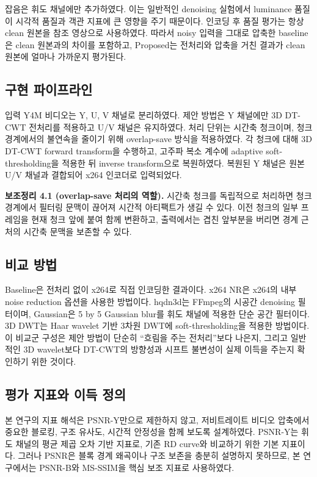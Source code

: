 \documentclass[10pt]{article}
\begin{document}
잡음은 휘도 채널에만 추가하였다. 이는 일반적인 denoising 실험에서 luminance 품질이 시각적 품질과 객관 지표에 큰 영향을 주기 때문이다. 인코딩 후 품질 평가는 항상 clean 원본을 참조 영상으로 사용하였다. 따라서 noisy 입력을 그대로 압축한 baseline은 clean 원본과의 차이를 포함하고, Proposed는 전처리와 압축을 거친 결과가 clean 원본에 얼마나 가까운지 평가된다.

\subsection{구현 파이프라인}
입력 Y4M 비디오는 Y, U, V 채널로 분리하였다. 제안 방법은 Y 채널에만 3D DT-CWT 전처리를 적용하고 U/V 채널은 유지하였다. 처리 단위는 시간축 청크이며, 청크 경계에서의 불연속을 줄이기 위해 overlap-save 방식을 적용하였다. 각 청크에 대해 3D DT-CWT forward transform을 수행하고, 고주파 복소 계수에 adaptive soft-thresholding을 적용한 뒤 inverse transform으로 복원하였다. 복원된 Y 채널은 원본 U/V 채널과 결합되어 x264 인코더로 입력되었다.

\noindent\textbf{보조정리 4.1 (overlap-save 처리의 역할).}
시간축 청크를 독립적으로 처리하면 청크 경계에서 필터링 문맥이 끊어져 시간적 아티팩트가 생길 수 있다. 이전 청크의 일부 프레임을 현재 청크 앞에 붙여 함께 변환하고, 출력에서는 겹친 앞부분을 버리면 경계 근처의 시간축 문맥을 보존할 수 있다.

\subsection{비교 방법}
Baseline은 전처리 없이 x264로 직접 인코딩한 결과이다. x264 NR은 x264의 내부 noise reduction 옵션을 사용한 방법이다. hqdn3d는 FFmpeg의 시공간 denoising 필터이며, Gaussian은 5 by 5 Gaussian blur를 휘도 채널에 적용한 단순 공간 필터이다. 3D DWT는 Haar wavelet 기반 3차원 DWT에 soft-thresholding을 적용한 방법이다. 이 비교군 구성은 제안 방법이 단순히 ``흐림을 주는 전처리''보다 나은지, 그리고 일반적인 3D wavelet보다 DT-CWT의 방향성과 시프트 불변성이 실제 이득을 주는지 확인하기 위한 것이다.

\subsection{평가 지표와 이득 정의}
본 연구의 지표 해석은 PSNR-Y만으로 제한하지 않고, 저비트레이트 비디오 압축에서 중요한 블로킹, 구조 유사도, 시간적 안정성을 함께 보도록 설계하였다. PSNR-Y는 휘도 채널의 평균 제곱 오차 기반 지표로, 기존 RD curve와 비교하기 위한 기본 지표이다. 그러나 PSNR은 블록 경계 왜곡이나 구조 보존을 충분히 설명하지 못하므로, 본 연구에서는 PSNR-B와 MS-SSIM을 핵심 보조 지표로 사용하였다.
\end{document}
